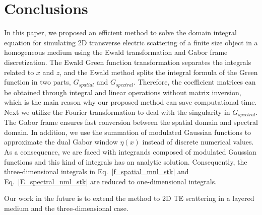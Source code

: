 \documentclass[preprint,12pt]{elsarticle}
\begin{document}
\section{Conclusions}
\label{conclusions}
 In this paper, we proposed an efficient method to solve the domain integral equation for simulating 2D transverse electric scattering of a finite size object in a homogeneous medium using the Ewald transformation and Gabor frame discretization. The Ewald Green function transformation separates the integrals related to $x$ and $z$, and the Ewald method splits the integral formula of the Green function in two parts, $G_{spatial}$ and $G_{spectral}$. Therefore, the coefficient matrices can be obtained through integral and linear operations without matrix inversion, {which} is the main reason why our proposed method can save computational time. Next we utilize the Fourier {transformation} to deal with the singularity in $G_{spectral}$.  The Gabor frame ensures fast conversion between {the} spatial domain and spectral domain. In addition, we use the summation of modulated Gaussian functions to approximate the dual Gabor window $\eta (x)$ instead of discrete numerical values. As a consequence, we are faced with integrands composed of modulated Gaussian functions and this kind of integrals has an analytic solution. Consequently, the three-dimensional integrals in Eq.~\eqref{f_spatial_mnl_stk} and Eq.~\eqref{E_spectral_nml_stk} {are reduced to one-dimensional integrals.}

Our work in the future is to extend the method to 2D TE scattering in {a} layered medium and the {three-dimensional} case.


\end{document}
